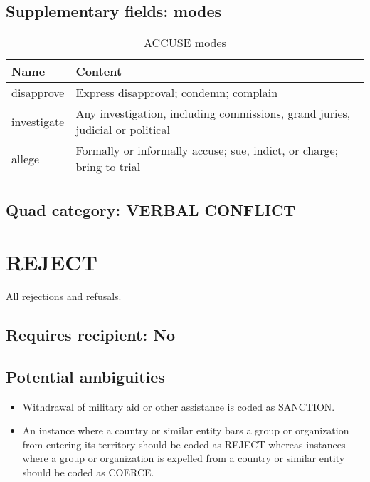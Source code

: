 \documentclass[11pt]{report}
\newcommand{\plcat}[1]{\textsf{#1}}
\begin{document}
\subsection{Supplementary fields: modes}

\begin{table}[htp]
\caption{\plcat{ACCUSE} modes}
\begin{center}
\begin{tabular}{|l|p{13cm}|}
\hline
Name & Content \\
\hline
disapprove & Express disapproval; condemn; complain\\
investigate & Any investigation, including commissions, grand juries, judicial or political\\
allege & Formally or informally accuse; sue, indict, or charge; bring to trial\\
\hline
\end{tabular}
\end{center}
\label{tab:accusemode}
\end{table}%

\subsection{Quad category: VERBAL CONFLICT}

\newpage


\section{REJECT}

All rejections and refusals.

\subsection{Requires recipient: No}

\subsection{Potential ambiguities}

\begin{itemize}
\item Withdrawal of military aid or other assistance is coded as \plcat{SANCTION}.
\item An instance where a country or similar entity bars a group or organization from entering its territory should be coded as \plcat{REJECT} whereas instances where a group or organization is expelled from a country or similar entity should be coded as \plcat{COERCE}.
\end{itemize}
\end{document}
